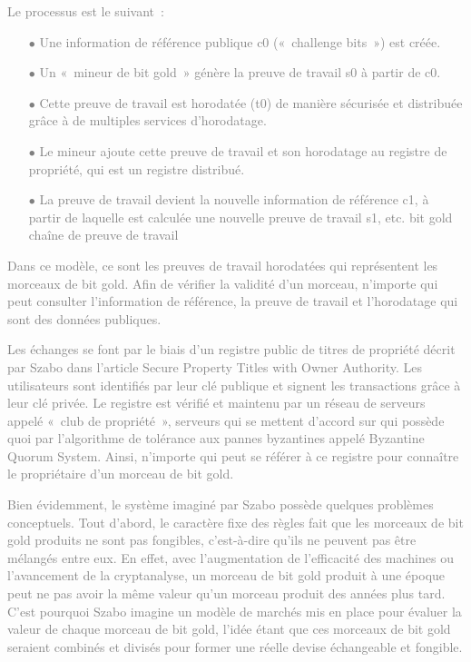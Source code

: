\textcolor{gray}{Le processus est le suivant~:}

\textcolor{gray}{
\begin{itemize}
\item[$\bullet$] Une information de référence publique c0 («~challenge bits~») est créée.
\item[$\bullet$] Un «~mineur de bit gold~» génère la preuve de travail s0 à partir de c0.
\item[$\bullet$] Cette preuve de travail est horodatée (t0) de manière sécurisée et distribuée grâce à de multiples services d'horodatage.
\item[$\bullet$] Le mineur ajoute cette preuve de travail et son horodatage au registre de propriété, qui est un registre distribué.
\item[$\bullet$] La preuve de travail devient la nouvelle information de référence c1, à partir de laquelle est calculée une nouvelle preuve de travail s1, etc.
bit gold chaîne de preuve de travail
\end{itemize}
}

\textcolor{gray}{Dans ce modèle, ce sont les preuves de travail horodatées qui représentent les morceaux de bit gold. Afin de vérifier la validité d'un morceau, n'importe qui peut consulter l'information de référence, la preuve de travail et l'horodatage qui sont des données publiques.}

\textcolor{gray}{Les échanges se font par le biais d'un registre public de titres de propriété décrit par Szabo dans l'article Secure Property Titles with Owner Authority. Les utilisateurs sont identifiés par leur clé publique et signent les transactions grâce à leur clé privée. Le registre est vérifié et maintenu par un réseau de serveurs appelé «~club de propriété~», serveurs qui se mettent d'accord sur qui possède quoi par l'algorithme de tolérance aux pannes byzantines appelé Byzantine Quorum System. Ainsi, n'importe qui peut se référer à ce registre pour connaître le propriétaire d'un morceau de bit gold.}

\textcolor{gray}{Bien évidemment, le système imaginé par Szabo possède quelques problèmes conceptuels. Tout d'abord, le caractère fixe des règles fait que les morceaux de bit gold produits ne sont pas fongibles, c'est-à-dire qu'ils ne peuvent pas être mélangés entre eux. En effet, avec l'augmentation de l'efficacité des machines ou l'avancement de la cryptanalyse, un morceau de bit gold produit à une époque peut ne pas avoir la même valeur qu'un morceau produit des années plus tard. C'est pourquoi Szabo imagine un modèle de marchés mis en place pour évaluer la valeur de chaque morceau de bit gold, l'idée étant que ces morceaux de bit gold seraient combinés et divisés pour former une réelle devise échangeable et fongible.}

